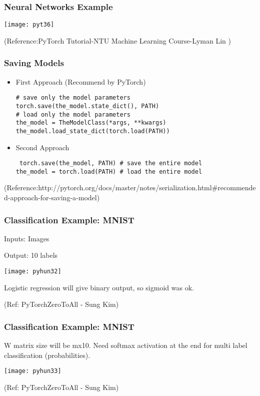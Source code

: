 \begin{frame}[fragile] \frametitle{Neural Networks Example}
\begin{center}
\texttt{[image: pyt36]}
\end{center}
\tiny{(Reference:PyTorch Tutorial-NTU Machine Learning Course-Lyman Lin )}
\end{frame}

\begin{frame}[fragile] \frametitle{Saving Models}
\begin{itemize}
\item  First Approach (Recommend by PyTorch)
\begin{lstlisting}
# save only the model parameters
torch.save(the_model.state_dict(), PATH)
# load only the model parameters
the_model = TheModelClass(*args, **kwargs)
the_model.load_state_dict(torch.load(PATH))
\end{lstlisting}

\item Second Approach
\begin{lstlisting}
 torch.save(the_model, PATH) # save the entire model
the_model = torch.load(PATH) # load the entire model
\end{lstlisting}
\end{itemize}
\tiny{(Reference:http://pytorch.org/docs/master/notes/serialization.html\#recommended-approach-for-saving-a-model)}
\end{frame}


\begin{frame}[fragile] \frametitle{Classification Example: MNIST}
Inputs: Images

Output: 10 labels

\begin{center}
\texttt{[image: pyhun32]}
\end{center}

Logistic regression will give binary output, so sigmoid was ok.

\tiny{(Ref: PyTorchZeroToAll  - Sung Kim)}
\end{frame}

\begin{frame}[fragile] \frametitle{Classification Example: MNIST}
W matrix size will be mx10. Need softmax activation at the end for multi label classification (probabilities).

\begin{center}
\texttt{[image: pyhun33]}
\end{center}


\tiny{(Ref: PyTorchZeroToAll  - Sung Kim)}
\end{frame}

